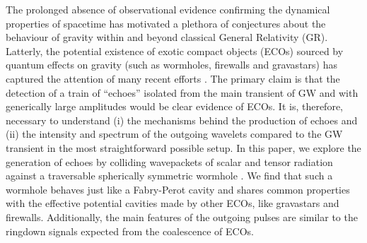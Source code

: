 \documentclass[article,aps,nofootinbib,twocolumn,superscriptaddress]{revtex4-1}
\begin{document}
The prolonged absence of observational evidence confirming the dynamical properties of spacetime has motivated a plethora of conjectures about the behaviour of gravity within and beyond \citep{Clifton:2011jh, Taliotis:2012sx, Joyce:2014kja} classical General Relativity (GR). Latterly, the potential existence of exotic compact objects (ECOs) sourced by quantum effects on gravity \citep{PhysRevLett.61.1446, Almheiri:2012rt, Mazur:2001fv} (such as wormholes, firewalls and gravastars) has captured the attention of many recent efforts \citep{Cardoso:2016oxy, Abedi:2016hgu, Abedi:2018npz}. The primary claim is that the detection of a train of ``echoes'' isolated from the main transient of GW and with generically large amplitudes would be clear evidence of ECOs. It is, therefore, necessary to understand (i) the mechanisms behind the production of echoes and (ii) the intensity and spectrum of the outgoing wavelets compared to the GW transient in the most straightforward possible setup. In this paper, we explore the generation of echoes by colliding wavepackets of scalar and tensor radiation against a traversable spherically symmetric wormhole \citep{Visser:1989kh}. We find that such a wormhole behaves just like a Fabry-Perot cavity and shares common properties with the effective potential cavities made by other ECOs, like gravastars and firewalls. Additionally, the main features of the outgoing pulses are similar to the ringdown signals expected from the coalescence of ECOs.
\end{document}
